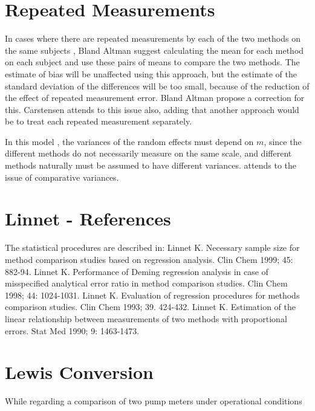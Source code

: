 \documentclass[12pt, a4paper]{report}
\theoremstyle{plain}
\theoremstyle{definition}
\theoremstyle{remark}
\begin{document}

	\section{Repeated Measurements}
	
	In cases where there are repeated measurements by each of the two
	methods on the same subjects , Bland Altman suggest calculating
	the mean for each method on each subject and use these pairs of
	means to compare the two methods.
	The estimate of bias will be unaffected using this approach, but
	the estimate of the standard deviation of the differences will be
	too small, because of the reduction of the effect of repeated
	measurement error. Bland Altman propose a correction for this.
	Carstensen attends to this issue also, adding that another
	approach would be to treat each repeated measurement separately.
	
	
	
	In this model , the variances of the random effects must depend on
	$m$, since the different methods do not necessarily measure on the
	same scale, and different methods naturally must be assumed to
	have different variances. \citet{BXC2004} attends to the issue of
	comparative variances.


	\section{Linnet - References}
	The statistical procedures are described in:
	Linnet K. Necessary sample size for method comparison studies based on regression analysis. Clin Chem 1999; 45: 882-94.
	Linnet K. Performance of Deming regression analysis in case of misspecified analytical error ratio in method comparison studies. Clin Chem 1998; 44: 1024-1031.
	Linnet K. Evaluation of regression procedures for methods comparison studies. Clin Chem 1993; 39. 424-432.
	Linnet K. Estimation of the linear relationship between measurements of two methods with proportional errors. Stat Med 1990; 9: 1463-1473.
	
	
\section{Lewis Conversion} 
While regarding a comparison of two pump meters under operational conditions
\end{document}

